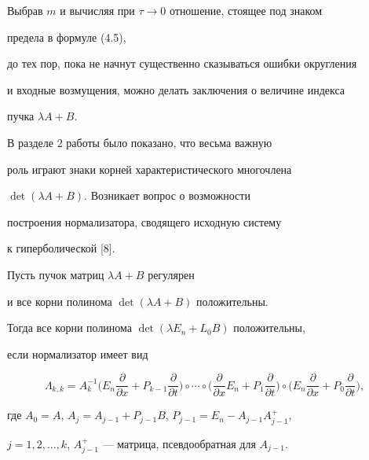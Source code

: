 Выбрав $m$ и вычисляя при $\tau \to 0$ отношение, стоящее под знаком


предела в формуле (4.5),


до тех пор, пока не начнут существенно сказываться ошибки округления


и входные возмущения, можно делать заключения о величине индекса


пучка $\lambda A+B$.





В разделе 2 работы было показано, что весьма важную


роль играют знаки корней характеристического многочлена


$\det (\lambda A+B)$. Возникает вопрос о возможности


построения нормализатора, сводящего исходную систему


к гиперболической [8].





\begin{thms}


Пусть пучок матриц $\lambda A+B$ регулярен


и все корни полинома $\det (\lambda A+B)$ положительны.





Тогда все корни полинома $\det (\lambda E_n+L_0B)$ положительны,


если нормализатор имеет вид


$$


\Lambda _{k,k}=A_k^{-1}\bigg( E_n\frac{\partial }{\partial x}+


P_{k-1}\frac{\partial }{\partial t} \bigg)


\circ \dotsb \circ


\bigg(\frac{\partial }{\partial x}E_n+


P_1\frac{\partial }{\partial t} \bigg)


\circ


\bigg( E_n\frac{\partial }{\partial x}+


P_0\frac{\partial }{\partial t} \bigg),


$$


где $A_0=A$, $A_j=A_{j-1}+P_{j-1}B$, $P_{j-1}=E_n-A_{j-1}A_{j-1}^{+}$,


$j=1,2,\dotsc, k$, $A^+_{j-1}$ --- матрица, псевдообратная для $A_{j-1}$.


\end{thms}





